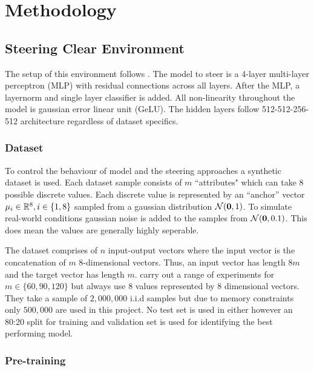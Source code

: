 \chapter{Methodology}

\section{Steering Clear Environment}
\label{steering-clear}

The setup of this environment follows \cite{steering-clear}.
The model to steer is a 4-layer multi-layer perceptron (MLP) with residual connections \cite{resnet} across all layers.
After the MLP, a layernorm \cite{layernorm} and single layer classifier is added.
All non-linearity throughout the model is gaussian error linear unit (GeLU).
The hidden layers follow 512-512-256-512 architecture regardless of dataset specifics.

\subsection{Dataset}
\label{steering-clear:dataset}

To control the behaviour of model and the steering approaches a synthetic dataset is used.
Each dataset sample consists of $m$ ``attributes" which can take 8 possible discrete values.
Each discrete value is represented by an ``anchor'' vector $\mathbf{\mu}_i \in \mathbb{R}^8, i \in \{1,8\}$ sampled from a gaussian distribution $\mathcal{N}(\mathbf{0}, 1)$.
To simulate real-world conditions gaussian noise is added to the samples from $\mathcal{N}(\mathbf{0}, 0.1)$.
This does mean the values are generally highly seperable.

The dataset comprises of $n$ input-output vectors where the input vector is the concatenation of $m$ 8-dimensional vectors.
Thus, an input vector has length $8m$ and the target vector has length $m$.
\citet{steering-clear} carry out a range of experiments for $m \in \{60, 90, 120\}$ but always use 8 values represented by 8 dimensional vectors.
They take a sample of $2,000,000$ i.i.d samples but due to memory constraints only $500,000$ are used in this project.
No test set is used in either however an 80:20 split for training and validation set is used for identifying the best performing model.

\subsection{Pre-training}

